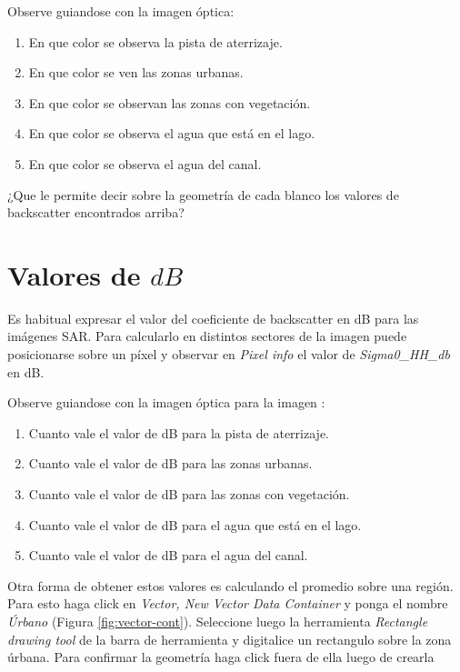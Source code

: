 Observe guiandose con la imagen óptica:

\begin{enumerate}
    \item En que color se observa la pista de aterrizaje.
    \item En que color se ven las zonas urbanas.
    \item En que color se observan las zonas con vegetación.
    \item En que color se observa el agua que está en el lago.
    \item En que color se observa el agua del canal.
\end{enumerate}

\begin{que}
    ¿Que le permite decir sobre la geometría de cada blanco los valores de backscatter encontrados arriba?
\end{que}

\section{Valores de $dB$}

Es habitual expresar el valor del coeficiente de backscatter en dB para las imágenes SAR. Para calcularlo en distintos sectores de la imagen puede posicionarse sobre un píxel y observar en \emph{Pixel info} el valor de \emph{Sigma0_HH_db} en dB.

Observe guiandose con la imagen óptica para la imagen :

\begin{enumerate}
    \item Cuanto vale el valor de dB para la pista de aterrizaje.
    \item Cuanto vale el valor de dB para las zonas urbanas.
    \item Cuanto vale el valor de dB para las zonas con vegetación.
    \item Cuanto vale el valor de dB para el agua que está en el lago.
    \item Cuanto vale el valor de dB para el agua del canal.
\end{enumerate}

Otra forma de obtener estos valores es calculando el promedio sobre una región. Para esto haga click en \emph{Vector, New Vector Data Container} y ponga el nombre \emph{Úrbano} (Figura \ref{fig:vector-cont}). Seleccione luego la herramienta \emph{Rectangle drawing tool} de la barra de herramienta y digitalice un rectangulo sobre la zona úrbana. Para confirmar la geometría haga click fuera de ella luego de crearla

